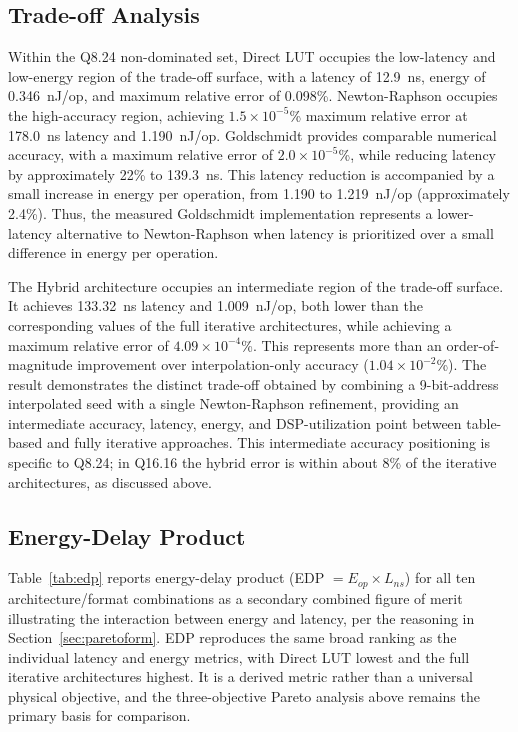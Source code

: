\documentclass[manuscript,screen,review]{acmart}
\begin{document}
\subsection{Trade-off Analysis}

Within the Q8.24 non-dominated set, Direct LUT occupies the low-latency and low-energy region of the trade-off surface, with a latency of 12.9~ns, energy of 0.346~nJ/op, and maximum relative error of 0.098\%. Newton-Raphson occupies the high-accuracy region, achieving $1.5\times10^{-5}$\% maximum relative error at 178.0~ns latency and 1.190~nJ/op. Goldschmidt provides comparable numerical accuracy, with a maximum relative error of $2.0\times10^{-5}$\%, while reducing latency by approximately 22\% to 139.3~ns. This latency reduction is accompanied by a small increase in energy per operation, from 1.190 to 1.219~nJ/op (approximately 2.4\%). Thus, the measured Goldschmidt implementation represents a lower-latency alternative to Newton-Raphson when latency is prioritized over a small difference in energy per operation.

The Hybrid architecture occupies an intermediate region of the trade-off surface. It achieves 133.32~ns latency and 1.009~nJ/op, both lower than the corresponding values of the full iterative architectures, while achieving a maximum relative error of $4.09\times10^{-4}$\%. This represents more than an order-of-magnitude improvement over interpolation-only accuracy ($1.04\times10^{-2}$\%). The result demonstrates the distinct trade-off obtained by combining a 9-bit-address interpolated seed with a single Newton-Raphson refinement, providing an intermediate accuracy, latency, energy, and DSP-utilization point between table-based and fully iterative approaches. This intermediate accuracy positioning is specific to Q8.24; in Q16.16 the hybrid error is within about 8\% of the iterative architectures, as discussed above.

\subsection{Energy-Delay Product}
\label{sec:edp}

Table~\ref{tab:edp} reports energy-delay product (EDP $= E_{op} \times L_{ns}$) for all ten architecture/format combinations as a secondary combined figure of merit illustrating the interaction between energy and latency, per the reasoning in Section~\ref{sec:paretoform}. EDP reproduces the same broad ranking as the individual latency and energy metrics, with Direct LUT lowest and the full iterative architectures highest. It is a derived metric rather than a universal physical objective, and the three-objective Pareto analysis above remains the primary basis for comparison.
\end{document}
